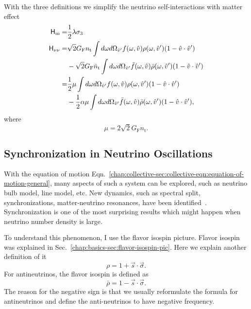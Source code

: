 With the three definitions we simplify the neutrino self-interactions with matter effect
\begin{align*}
    \mathsf H_\mathrm m =& \frac{1}{2} \lambda \sigma_3 \\
    \mathsf H_{\nu\nu} =& \sqrt{2}G_{\mathrm F} n_{\mathrm{t}} \int d\omega d\Omega_{\hat v'} f(\omega,\hat v)\rho(\omega,\hat v') (1-\hat v \cdot \hat v') \\
   & - \sqrt{2}G_{\mathrm F} \bar n_{\mathrm{t}} \int d\omega d\Omega_{\hat v'} \bar f(\omega,\hat v)\bar\rho(\omega,\hat v') (1-\hat v \cdot \hat v') \\
   =& \frac{1}{2}\mu \int d\omega d\Omega_{\hat v'} f(\omega, \hat v)\rho(\omega,\hat v') (1-\hat v \cdot \hat v') \\
   & - \frac{1}{2}\alpha \mu \int d\omega d\Omega_{\hat v'} \bar f(\omega, \hat v)\bar\rho(\omega,\hat v') (1-\hat v \cdot \hat v') ,
\end{align*}
where
\begin{equation}
   \mu = 2\sqrt{2} G_{\mathrm F} n_{\mathrm{t}}.
\end{equation}




\subsection{Synchronization in Neutrino Oscillations}


With the equation of motion Eqn.~\ref{chap:collective-sec:collective-eqn:equation-of-motion-general}, many aspects of such a system can be explored, such as neutrino bulb model, line model, etc. New dynamics, such as spectral split, synchronizations, matter-neutrino resonances, have been identified~\cite{Duan2006,Malkus2014,Vaananen2015}. Synchronization is one of the most surprising results which might happen when neutrino number density is large.

To understand this phenomenon, I use the flavor isospin picture. Flavor isospin was explained in Sec.~\ref{chap:basics-sec:flavor-isospin-pic}. Here we explain another definition of it
\begin{equation}
   \rho = 1 + \vec s \cdot \vec \sigma.
\end{equation}
For antineutrinos, the flavor isospin is defined as
\begin{equation}
    \bar\rho = 1 - \vec s \cdot \vec \sigma.
\end{equation}
The reason for the negative sign is that we usually reformulate the formula for antineutrinos and define the anti-neutrinos to have negative frequency.


